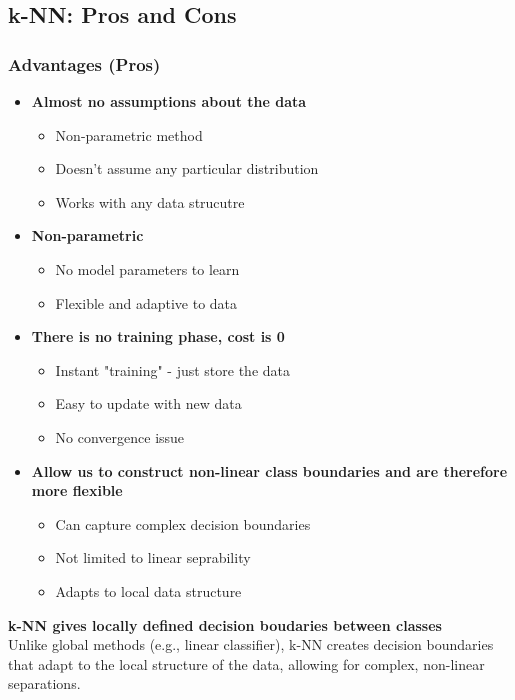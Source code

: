 \documentclass[a4paper]{article}
\theoremstyle{definition}
\begin{document}
\subsection{k-NN: Pros and Cons}
\subsubsection{Advantages (Pros)}
\begin{itemize}
    \item \textbf{Almost no assumptions about the data}
    \begin{itemize}
        \item Non-parametric method 
        \item Doesn't assume any particular distribution 
        \item Works with any data strucutre
    \end{itemize}
    \item \textbf{Non-parametric}
    \begin{itemize}
        \item No model parameters to learn 
        \item Flexible and adaptive to data 
    \end{itemize}
    \item \textbf{There is no training phase, cost is 0}
    \begin{itemize}
        \item Instant "training" - just store the data 
        \item Easy to update with new data
        \item No convergence issue 
    \end{itemize}
    \item \textbf{Allow us to construct non-linear class boundaries and are therefore more flexible}
    \begin{itemize}
        \item Can capture complex decision boundaries 
        \item Not limited to linear seprability 
        \item Adapts to local data structure 
    \end{itemize}
\end{itemize}
\begin{tcolorbox}[
    colback=green!15!white,
    colframe=green!15!white,
    boxrule=0pt,
    arc=0pt,
    halign=center
]
    \textbf{k-NN gives locally defined decision boudaries between classes}\\[0.6em]
    Unlike global methods (e.g., linear classifier), k-NN creates decision boundaries that adapt to the local 
    structure of the data, allowing for complex, non-linear separations.
\end{tcolorbox}
\end{document}
